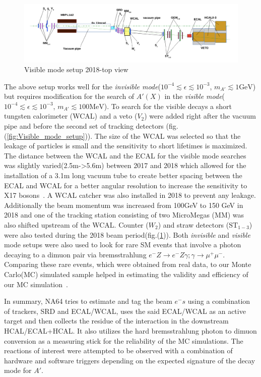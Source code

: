 \begin{figure}[t!]
\centering
\includegraphics[width=\textwidth]{thesis_figures/visible_mode_newest.png}
\caption{Visible mode setup 2018-top view~\cite{Gninenko:2677228}}
\label{fig:Visible_mode_setup_side}
\end{figure}

The above setup works well for the \textit{invisible mode}($10^{-4} \lesssim \epsilon \lesssim 10^{-3}$, $m_{A'} \lesssim 1 \text{GeV}$) but requires modification for the search of $A'(X)$ in the \textit{visible mode}($10^{-4} \lesssim \epsilon \lesssim 10^{-3}$, $m_{A'} \lesssim 100 \text{MeV}$). To search for the visible decays a short tungsten calorimeter (WCAL) and a veto ($V_2$) were added right after the vacuum pipe and before the second set of tracking detectors (fig.(\ref{fig:Visible_mode_setup})). The size of the WCAL was selected so that the leakage of particles is small and the sensitivity to short lifetimes is maximized. The distance between the WCAL and the ECAL for the visible mode searches was slightly varied(2.5m->5.6m) between 2017 and 2018 which allowed for the installation of a 3.1m long vacuum tube to create better spacing between the ECAL and WCAL for a better angular resolution to increase the sensitivity to X17 bosons~\cite{Banerjee_2018}. A WCAL catcher was also installed in 2018 to prevent any leakage. Additionally the beam momentum was increased from 100GeV to 150 GeV in 2018 and one of the tracking station consisting of two MicroMegas (MM) was also shifted upstream of the WCAL. Counter ($W_2$) and straw detectors ($\text{ST}_{1-3}$) were also tested during the 2018 beam period(fig.(\ref{fig:Visible_mode_setup_side})). Both \textit{invisible} and \textit{visible} mode setups were also used to look for rare SM events that involve a photon decaying to a dimuon pair via bremsstrahlung $e^-Z\rightarrow e^-Z\gamma;\gamma\rightarrow \mu^{+} \mu^{-} $. Comparing these rare events, which were obtained from real data, to our Monte Carlo(MC) simulated sample helped in estimating the validity and efficiency of our MC simulation~\cite{Gninenko:2677228}.

In summary, NA64 tries to estimate and tag the beam $e^-s$ using a combination of trackers, SRD and ECAL/WCAL, uses the said ECAL/WCAL as an active target and then collects the residue of the interaction in the downstream HCAL/ECAL+HCAL. It also utilizes the hard bremsstrahlung photon to dimuon conversion as a measuring stick for the reliability of the MC simulations. The reactions of interest were attempted to be observed with a combination of hardware and software triggers depending on the expected signature of the decay mode for $A'$.

